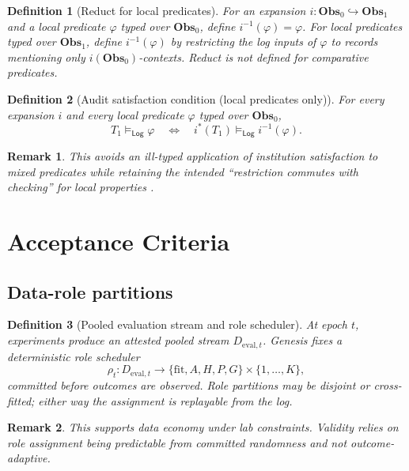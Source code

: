 \documentclass[11pt,a4paper]{article}
\newtheorem{definition}{Definition}[section]
\newtheorem{remark}{Remark}[section]
\newcommand{\Obs}{\mathbf{Obs}}
\newcommand{\Log}{\mathsf{Log}}
\begin{document}
\begin{definition}[Reduct for local predicates]
For an expansion $i:\Obs_0\hookrightarrow\Obs_1$ and a \emph{local} predicate $\varphi$ typed over $\Obs_0$, define $i^{-1}(\varphi)=\varphi$.
For local predicates typed over $\Obs_1$, define $i^{-1}(\varphi)$ by restricting the log inputs of $\varphi$ to records mentioning only $i(\Obs_0)$-contexts.
Reduct is \emph{not defined} for comparative predicates.
\end{definition}

\begin{definition}[Audit satisfaction condition (local predicates only)]
For every expansion $i$ and every \emph{local} predicate $\varphi$ typed over $\Obs_0$,
\[
T_1\models_{\Log}\varphi \quad \Longleftrightarrow\quad i^*(T_1)\models_{\Log} i^{-1}(\varphi).
\]
\end{definition}

\begin{remark}
This avoids an ill-typed application of institution satisfaction to mixed predicates while retaining the intended ``restriction commutes with checking'' for local properties \citep{GoguenBurstall1992}.
\end{remark}

\section{Acceptance Criteria}

\subsection{Data-role partitions}
\begin{definition}[Pooled evaluation stream and role scheduler]
At epoch $t$, experiments produce an attested pooled stream $D_{\mathrm{eval},t}$.
Genesis fixes a deterministic role scheduler
\[
\rho_t:D_{\mathrm{eval},t}\to\{\mathrm{fit},A,H,P,G\}\times\{1,\dots,K\},
\]
committed before outcomes are observed.
Role partitions may be disjoint or cross-fitted; either way the assignment is replayable from the log.
\end{definition}

\begin{remark}
This supports data economy under lab constraints.
Validity relies on role assignment being predictable from committed randomness and not outcome-adaptive.
\end{remark}
\end{document}
